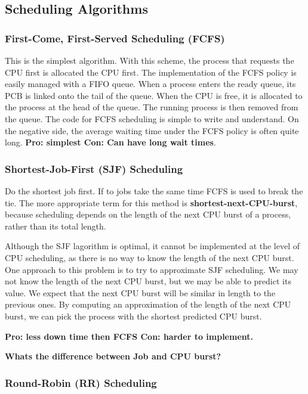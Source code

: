 \documentclass{article}
\begin{document}
\subsection{Scheduling Algorithms}

\subsubsection{First-Come, First-Served Scheduling (FCFS)}
This is the simplest algorithm. With this scheme, the process that requests the
CPU first is allocated the CPU first. The implementation of the FCFS policy is
easily managed with a FIFO queue. When a process enters the ready queue, its
PCB is linked onto the tail of the queue. When the CPU is free, it is allocated to
the process at the head of the queue. The running process is then removed from
the queue. The code for FCFS scheduling is simple to write and understand.
On the negative side, the average waiting time under the FCFS policy is
often quite long. {\bf Pro: simplest Con: Can have long wait times}.

\subsubsection{Shortest-Job-First (SJF) Scheduling}
Do the shortest job first. If to jobs take the same time FCFS is used to break the tie.
The more appropriate term for this method is {\bf shortest-next-CPU-burst}, because scheduling depends on the length of the next CPU burst of
a process, rather than its total length. 


Although the SJF lagorithm is optimal, it cannot be implemented at the level of CPU scheduling, 
as there is no way to know the length of the next CPU burst.
One approach to this problem is to try to approximate SJF scheduling. We may
not know the length of the next CPU burst, but we may be able to predict its
value. We expect that the next CPU burst will be similar in length to the previous
ones. By computing an approximation of the length of the next CPU burst, we
can pick the process with the shortest predicted CPU burst.



{\bf Pro: less down time then FCFS Con: harder to implement.}

 
{\bf Whats the difference between Job and CPU burst?}


\subsubsection{Round-Robin (RR) Scheduling}
\end{document}
